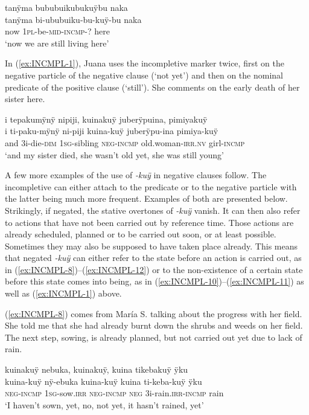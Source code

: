 \ea\label{ex:INCMPL-7}
\begingl
\glpreamble tanÿma bububuikubukuÿbu naka\\
\gla tanÿma bi-ububuiku-bu-kuÿ-bu naka\\
\glb now 1\textsc{pl}-be-\textsc{mid}-\textsc{incmp}-? here\\
\glft ‘now we are still living here’
\endgl
\trailingcitation{[mqx-p110826l.093-094]}
\xe


In (\ref{ex:INCMPL-1}), Juana uses the incompletive marker twice, first on the negative particle of the negative clause (‘not yet’) and then on the nominal predicate of the positive clause (‘still’). She comments on the early death of her sister here.

\ea\label{ex:INCMPL-1}
\begingl 
\glpreamble i tepakumÿnÿ nipiji, kuinakuÿ juberÿpuina, pimiyakuÿ\\
\gla i ti-paku-mÿnÿ ni-piji kuina-kuÿ juberÿpu-ina pimiya-kuÿ\\ 
\glb and 3i-die-\textsc{dim} 1\textsc{sg}-sibling \textsc{neg}-\textsc{incmp} old.woman-\textsc{irr.nv} girl-\textsc{incmp}\\ 
\glft ‘and my sister died, she wasn’t old yet, she was still young’\\ 
\endgl
\trailingcitation{[jxx-p120430l-2.346-347]}
\xe

A few more examples of the use of \textit{-kuÿ} in negative clauses follow. The incompletive can either attach to the predicate or to the negative particle with the latter being much more frequent. Examples of both are presented below. Strikingly, if negated, the stative overtones of \textit{-kuÿ} vanish. It can then also refer to actions that have not been carried out by reference time. Those actions are already scheduled, planned or to be carried out soon, or at least possible. Sometimes they may also be supposed to have taken place already. This means that negated \textit{-kuÿ} can either refer to the state before an action is carried out, as in (\ref{ex:INCMPL-8})–(\ref{ex:INCMPL-12}) or to the non-existence of a certain state before this state comes into being, as in (\ref{ex:INCMPL-10})–(\ref{ex:INCMPL-11}) as well as (\ref{ex:INCMPL-1}) above.

(\ref{ex:INCMPL-8}) comes from María S. talking about the progress with her field. She told me that she had already burnt down the shrubs and weeds on her field. The next step, sowing, is already planned, but not carried out yet due to lack of rain.

\ea\label{ex:INCMPL-8}
\begingl
\glpreamble kuinakuÿ nebuka, kuinakuÿ, kuina tikebakuÿ ÿku\\
\gla kuina-kuÿ nÿ-ebuka kuina-kuÿ kuina ti-keba-kuÿ ÿku\\
\glb \textsc{neg}-\textsc{incmp} 1\textsc{sg}-sow.\textsc{irr} \textsc{neg}-\textsc{incmp} \textsc{neg} 3i-rain.\textsc{irr}-\textsc{incmp} rain\\
\glft ‘I haven’t sown, yet, no, not yet, it hasn’t rained, yet’
\endgl
\trailingcitation{[rmx-e150922l.023]}
\xe

